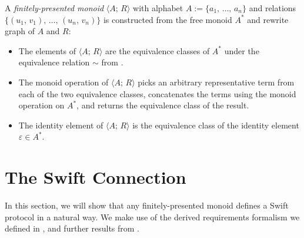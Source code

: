\documentclass[../generics]{subfiles}
\begin{document}
\begin{definition} A \emph{finitely-presented monoid} $\langle A;\, R\rangle$ with alphabet $A:=\{a_1,\,\ldots,\,a_n\}$ and relations $\{(u_1,\,v_1),\,\ldots,\,(u_n,\,v_n)\}$ is constructed from the free monoid $A^*$ and rewrite graph of $A$ and $R$:
\begin{itemize}
\item The elements of $\langle A;\, R\rangle$ are the equivalence classes of $A^*$ under the equivalence relation $\sim$ from .
\item The monoid operation of $\langle A;\, R\rangle$ picks an arbitrary representative term from each of the two equivalence classes, concatenates the terms using the monoid operation on $A^*$, and returns the equivalence class of the result.
\item The identity element of $\langle A;\, R\rangle$ is the equivalence class of the identity element $\varepsilon\in A^*$.
\end{itemize}
\end{definition}

\section{The Swift Connection}\label{monoidsasprotocols}

In this section, we will show that any finitely-presented monoid defines a Swift protocol in a natural way. We make use of the derived requirements formalism we defined in , and further results from .
\end{document}
